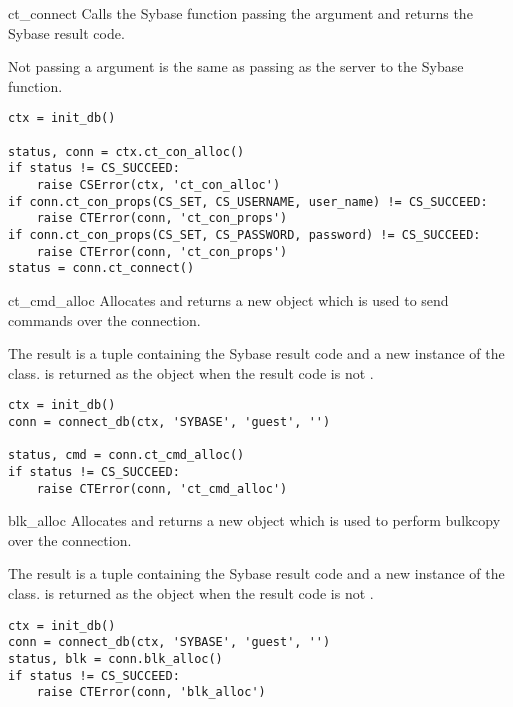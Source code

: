 \begin{methoddesc}[CS_CONNECTION]{ct_connect}{}
Calls the Sybase  function passing the
 argument and returns the Sybase result code.

Not passing a  argument is the same as passing 
as the server to the Sybase  function.

\begin{verbatim}
ctx = init_db()

status, conn = ctx.ct_con_alloc()
if status != CS_SUCCEED:
    raise CSError(ctx, 'ct_con_alloc')
if conn.ct_con_props(CS_SET, CS_USERNAME, user_name) != CS_SUCCEED:
    raise CTError(conn, 'ct_con_props')
if conn.ct_con_props(CS_SET, CS_PASSWORD, password) != CS_SUCCEED:
    raise CTError(conn, 'ct_con_props')
status = conn.ct_connect()
\end{verbatim}
\end{methoddesc}

\begin{methoddesc}[CS_CONNECTION]{ct_cmd_alloc}{}
Allocates and returns a new  object which is used to
send commands over the connection.

The result is a tuple containing the Sybase result code and a new
instance of the  class.  is returned as
the  object when the result code is not
.

\begin{verbatim}
ctx = init_db()
conn = connect_db(ctx, 'SYBASE', 'guest', '')

status, cmd = conn.ct_cmd_alloc()
if status != CS_SUCCEED:
    raise CTError(conn, 'ct_cmd_alloc')
\end{verbatim}
\end{methoddesc}

\begin{methoddesc}[CS_CONNECTION]{blk_alloc}{}
Allocates and returns a new  object which is used to
perform bulkcopy over the connection.

The result is a tuple containing the Sybase result code and a new
instance of the  class.  is returned as
the  object when the result code is not
.

\begin{verbatim}
ctx = init_db()
conn = connect_db(ctx, 'SYBASE', 'guest', '')
status, blk = conn.blk_alloc()
if status != CS_SUCCEED:
    raise CTError(conn, 'blk_alloc')
\end{verbatim}
\end{methoddesc}

